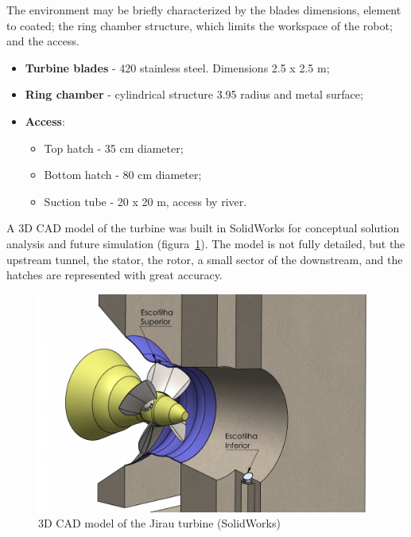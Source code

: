 The environment may be briefly characterized by the blades dimensions,
element to coated; the ring chamber structure, which limits
the workspace of the robot; and the access.

\begin{itemize}
  \item \textbf{Turbine blades} - 420 stainless steel. Dimensions 2.5 x 2.5 m;
  \item \textbf{Ring chamber} - cylindrical structure 3.95 radius and metal
  surface;
  \item \textbf{Access}: 
  	\begin{itemize}
    	\item Top hatch - 35 cm diameter;
  		\item Bottom hatch - 80 cm diameter;
  		\item Suction tube - 20 x 20 m, access by river. 
  	\end{itemize}
\end{itemize}

A 3D CAD model of the turbine was built in SolidWorks for
conceptual solution analysis and future simulation
(figura~\ref{fig::ambiente3d}). The model is not fully detailed, but the
upstream tunnel, the stator, the rotor, a small sector of the downstream, and
the hatches are represented with great accuracy.

\begin{figure}[h!]
\centering
	\includegraphics[width=\columnwidth]{figs/estudo/solid/ambiente_3d} 
	\caption{3D CAD model of the Jirau turbine (SolidWorks)}
	\label{fig::ambiente3d}
\end{figure}




